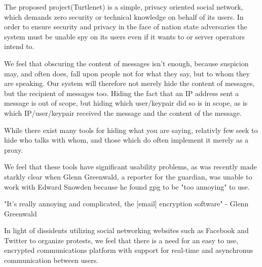 The proposed project(Turtlenet) is a simple, privacy oriented social
network, which demands zero security or technical knowledge on behalf of its
users. In order to ensure security and privacy in the face of nation state
adversaries the system must be unable spy on its users even if it wants to or
server operators intend to.

We feel that obscuring the content of messages isn't enough, because suspicion
may, and often does, fall upon people not for what they say, but to whom they
are speaking. Our system will therefore not merely hide
the content of messages, but the recipient of messages too. Hiding the fact that
an IP address sent a message is out of scope, but hiding which user/keypair did
so is in scope, as is which IP/user/keypair received the message and the content
of the message.

While there exist many tools for hiding what you are saying, relativly few seek
to hide who talks with whom, and those which do often implement it merely as a proxy.

We feel that these tools have significant usability problems, as was recently
made starkly clear when Glenn Greenwald, a reporter for the guardian, was unable
to work with Edward Snowden because he found gpg to be "too annoying" to use.

"It’s really annoying and complicated, the [email] encryption software" - Glenn
Greenwald \cite{greenwaldAnnoying}

In light of dissidents utilizing social networking websites such as Facebook and
Twitter to organize protests, we feel that there is a need for an easy to use,
encrypted communications platform with support for real-time and asynchronus
communication between users.
